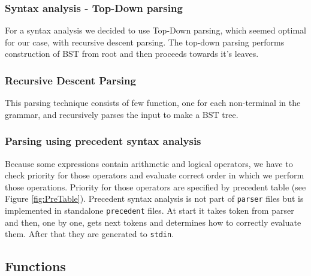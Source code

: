 \documentclass[11pt, titlepage]{article}
\begin{document}
\subsubsection{Syntax analysis - Top-Down parsing}\label{syntax-analysis---top-down-parsing}

For a syntax analysis we decided to use Top-Down parsing, which seemed
optimal for our case, with recursive descent parsing. The top-down
parsing performs construction of BST from root and then proceeds towards
it's leaves.

\subsubsection{Recursive Descent Parsing}\label{recursive-descent-parsing}

This parsing technique consists of few function, one for each
non-terminal in the grammar, and recursively parses the input to make a
BST tree.

\subsubsection{Parsing using precedent syntax
analysis}\label{parsing-using-precedent-syntax-analysis}

Because some expressions contain arithmetic and logical operators, we
have to check priority for those operators and evaluate correct order in
which we perform those operations. Priority for those operators are
specified by precedent table (see Figure \ref{fig:PreTable}). Precedent syntax
analysis is not part of \texttt{parser} files but is implemented in
standalone \texttt{precedent} files. At start it takes token from parser
and then, one by one, gets next tokens and determines how to correctly evaluate them.
After that they are generated to \texttt{stdin}.

\subsection{Functions}\label{functions}
\end{document}

